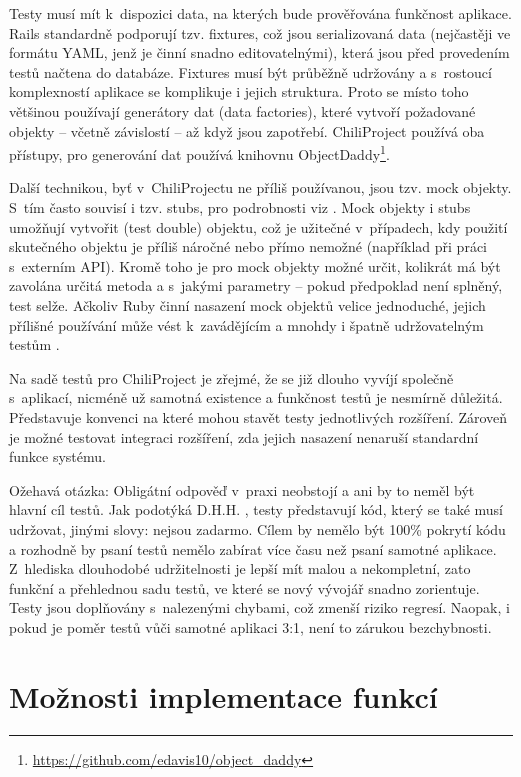 \documentclass[thesis=B,czech]{FITthesis}[2012/05/02]
\begin{document}
Testy musí mít k~dispozici data, na kterých bude prověřována
funkčnost aplikace. Rails standardně podporují tzv. fixtures, což jsou
serializovaná data (nejčastěji ve formátu \gls{YAML}, jenž je činní
snadno editovatelnými), která jsou před provedením testů načtena do
databáze. Fixtures musí být průběžně udržovány a s~rostoucí komplexností
aplikace se komplikuje i jejich struktura. Proto se místo toho většinou
používají generátory dat (data factories), které vytvoří požadované
objekty -- včetně závislostí -- až když jsou zapotřebí. ChiliProject
používá oba přístupy, pro generování dat používá knihovnu
ObjectDaddy\footnote{\url{https://github.com/edavis10/object_daddy}}.

Další technikou, byť v~ChiliProjectu ne příliš používanou, jsou tzv.
mock objekty. S~tím často souvisí i tzv. stubs, pro podrobnosti viz
\citep{FowlerMocks}. Mock objekty i stubs umožňují vytvořit
 (test double) objektu, což je užitečné
v~případech, kdy použití skutečného objektu je příliš náročné nebo přímo
nemožné (například při práci s~externím API). Kromě toho je pro
mock objekty možné určit, kolikrát má být zavolána určitá metoda a
s~jakými parametry -- pokud předpoklad není splněný, test selže. Ačkoliv
Ruby činní nasazení mock objektů velice jednoduché, jejich přílišné
používání může vést k~zavádějícím a mnohdy i špatně udržovatelným testům
\citep{Parsons2011}.

Na sadě testů pro ChiliProject je zřejmé, že se již dlouho vyvíjí
společně s~aplikací, nicméně už samotná existence a funkčnost testů je
nesmírně důležitá. Představuje konvenci na které mohou stavět testy
jednotlivých rozšíření. Zároveň je možné testovat integraci rozšíření,
zda jejich nasazení nenaruší standardní funkce systému.

Ožehavá otázka:  Obligátní odpověď 
v~praxi neobstojí a ani by to neměl být hlavní cíl testů. Jak podotýká
D.H.H. \citep{HanssonTestingTSA}, testy představují kód, který se
také musí udržovat, jinými slovy: nejsou zadarmo. Cílem by nemělo být
100\% pokrytí kódu a rozhodně by psaní testů nemělo zabírat více času
než psaní samotné aplikace. Z~hlediska dlouhodobé udržitelnosti je lepší
mít malou a nekompletní, zato funkční a přehlednou sadu testů, ve které
se nový vývojář snadno zorientuje. Testy jsou doplňovány s~nalezenými
chybami, což zmenší riziko regresí. Naopak, i pokud je poměr testů vůči
samotné aplikaci 3:1, není to zárukou bezchybnosti.

\section{Možnosti implementace funkcí}
\end{document}
